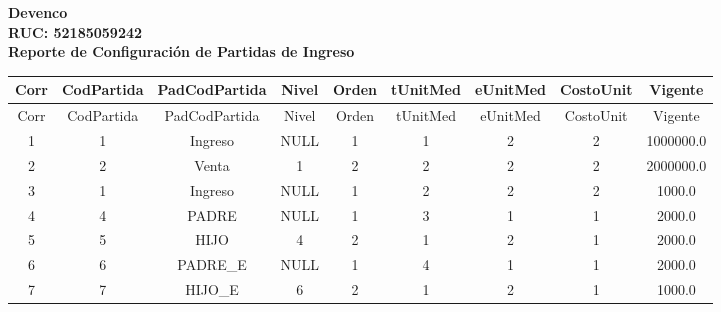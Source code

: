 \documentclass[a4paper, landscape]{article}
\begin{document}
\begin{center}
\vspace{0.5cm}
\textbf{\Huge Devenco}\\ %
\vspace{0.2cm}
\textbf{\Large RUC: 52185059242}\\ %
\vspace{1cm}
\textbf{\Large Reporte de Configuración de Partidas de Ingreso}
\end{center}
\vspace{1cm}
\begin{center}
\begin{longtable}{|c|c|c|c|c|c|c|c|c|}
\hline
Corr & CodPartida & PadCodPartida & Nivel & Orden & tUnitMed & eUnitMed & CostoUnit & Vigente \\
\hline
\endfirsthead
\hline
Corr & CodPartida & PadCodPartida & Nivel & Orden & tUnitMed & eUnitMed & CostoUnit & Vigente \\
\hline
\endhead
1 & 1 & Ingreso & NULL & 1 & 1 & 2 & 2 & 1000000.0 \\
2 & 2 & Venta & 1 & 2 & 2 & 2 & 2 & 2000000.0 \\
3 & 1 & Ingreso & NULL & 1 & 2 & 2 & 2 & 1000.0 \\
4 & 4 & PADRE & NULL & 1 & 3 & 1 & 1 & 2000.0 \\
5 & 5 & HIJO & 4 & 2 & 1 & 2 & 1 & 2000.0 \\
6 & 6 & PADRE_E & NULL & 1 & 4 & 1 & 1 & 2000.0 \\
7 & 7 & HIJO_E & 6 & 2 & 1 & 2 & 1 & 1000.0 \\
\hline
\end{longtable}
\end{center}
\end{document}
